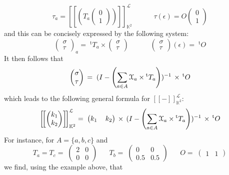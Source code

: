 \documentclass[3p]{elsarticle}
\newcommand{\fL}{\mathcal{L}}    %
\newcommand{\streamproduct}{\times} %
\newcommand{\beh}[3]{\left[\!\left[ #1 \right]\!\right]^{#2}_{#3}} %
\newcommand{\transp}{{}^{\mathrm{t}}}  %
\newcommand{\K}{\mathbb{K}}            %
\begin{document}
\[
\tau_a=\beh{(T_a
%
\left(%
\begin{array}{c}
  0 \\
  1
\end{array}\right))}{\fL}{\K^2}
%
\;\;\;\;\;\;\;\;\;\;\; \tau(\epsilon)=O \left(%
\begin{array}{c}
  0 \\
  1
\end{array}\right)
\]
\noindent
and this can be concisely expressed by the following system:
\[
\begin{pmatrix}
\sigma \\ \tau
\end{pmatrix} _a
= \; \transp{T_{a}} \streamproduct
\begin{pmatrix}
\sigma \\ \tau
\end{pmatrix}
\;\;\;\;\;\;\;\;\;\;\;
\begin{pmatrix}
\sigma \\ \tau
\end{pmatrix} (\epsilon)
= \; \transp{O}
\]
It then follows that
\[
\begin{pmatrix}%
\sigma \\ \tau
\end{pmatrix}
\, = \; (I - \left(\sum_{a\in A} \Xa \streamproduct
\transp{T_{a}}\right))^{-1} \, \streamproduct \, \transp{O}
\]
which leads to the following general formula for
$\beh{-}{\fL}{\K^2}$:
\[
\beh{\begin{pmatrix} k_1 \\ k_2
\end{pmatrix}}{\fL}{\K^2} = \;
\begin{pmatrix}
k_1 \,  & k_2
\end{pmatrix}
\, \streamproduct \, (I - \left(\sum_{a\in A} \Xa \streamproduct
\transp{T_{a}}\right))^{-1} \, \streamproduct \, \transp{O}
\]
For instance, for $A=\{a,b,c\}$ and
\[
T_a = T_c = \;
\begin{pmatrix}
2 & 0 \\ 0  & 0
\end{pmatrix}
\;\;\;\;\;\; T_b = \;
\begin{pmatrix}
0 & 0 \\ 0.5  & 0.5
\end{pmatrix}
\;\;\;\;\;\; O = \;
\begin{pmatrix}
1  &  1
\end{pmatrix}
\]
we find, using the example above, that
\end{document}
